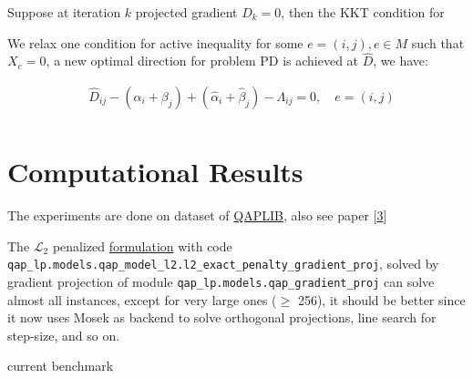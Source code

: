 \documentclass[
  10pt,
  a4paper,
,tablecaptionabove
]{scrartcl}
\begin{document}
Suppose at iteration \(k\) projected gradient \(D_k = 0\), then the KKT
condition for

We relax one condition for active inequality for some
\(e = (i,j), e \in M\) such that \(X_e =0\), a new optimal direction for
problem PD is achieved at \(\hat D\), we have:

\[\begin{aligned}
 & \hat D_{ij} - (\alpha_i + \beta_j) + (\hat \alpha_i + \hat \beta_j) - \Lambda_{ij} = 0, \quad e = (i,j) \\
\end{aligned}\]

\hypertarget{computational-results}{%
\section{Computational Results}\label{computational-results}}

The experiments are done on dataset of
\href{http://anjos.mgi.polymtl.ca/qaplib/}{QAPLIB}, also see paper
{[}\protect\hyperlink{ref-burkard1997qaplib}{3}{]}

The \(\mathscr L_2\) penalized
\protect\hyperlink{mathscr-l_2--mathscr-l_1-penalized-formulation}{formulation}
with code
\texttt{qap\_lp.models.qap\_model\_l2.l2\_exact\_penalty\_gradient\_proj},
solved by gradient projection of module
\texttt{qap\_lp.models.qap\_gradient\_proj} can solve almost all
instances, except for very large ones (\(\ge\) 256), it should be better
since it now uses Mosek as backend to solve orthogonal projections, line
search for step-size, and so on.

current benchmark
\end{document}
